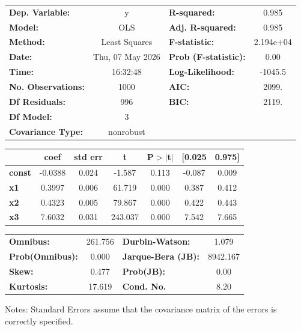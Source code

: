 \begin{center}
\begin{tabular}{lclc}
\toprule
\textbf{Dep. Variable:}    &        y         & \textbf{  R-squared:         } &     0.985   \\
\textbf{Model:}            &       OLS        & \textbf{  Adj. R-squared:    } &     0.985   \\
\textbf{Method:}           &  Least Squares   & \textbf{  F-statistic:       } & 2.194e+04   \\
\textbf{Date:}             & Thu, 07 May 2026 & \textbf{  Prob (F-statistic):} &     0.00    \\
\textbf{Time:}             &     16:32:48     & \textbf{  Log-Likelihood:    } &   -1045.5   \\
\textbf{No. Observations:} &        1000      & \textbf{  AIC:               } &     2099.   \\
\textbf{Df Residuals:}     &         996      & \textbf{  BIC:               } &     2119.   \\
\textbf{Df Model:}         &           3      & \textbf{                     } &             \\
\textbf{Covariance Type:}  &    nonrobust     & \textbf{                     } &             \\
\bottomrule
\end{tabular}
\begin{tabular}{lcccccc}
               & \textbf{coef} & \textbf{std err} & \textbf{t} & \textbf{P$> |$t$|$} & \textbf{[0.025} & \textbf{0.975]}  \\
\midrule
\textbf{const} &      -0.0388  &        0.024     &    -1.587  &         0.113        &       -0.087    &        0.009     \\
\textbf{x1}    &       0.3997  &        0.006     &    61.719  &         0.000        &        0.387    &        0.412     \\
\textbf{x2}    &       0.4323  &        0.005     &    79.867  &         0.000        &        0.422    &        0.443     \\
\textbf{x3}    &       7.6032  &        0.031     &   243.037  &         0.000        &        7.542    &        7.665     \\
\bottomrule
\end{tabular}
\begin{tabular}{lclc}
\textbf{Omnibus:}       & 261.756 & \textbf{  Durbin-Watson:     } &    1.079  \\
\textbf{Prob(Omnibus):} &   0.000 & \textbf{  Jarque-Bera (JB):  } & 8942.167  \\
\textbf{Skew:}          &   0.477 & \textbf{  Prob(JB):          } &     0.00  \\
\textbf{Kurtosis:}      &  17.619 & \textbf{  Cond. No.          } &     8.20  \\
\bottomrule
\end{tabular}
\end{center}

Notes: \newline
 [1] Standard Errors assume that the covariance matrix of the errors is correctly specified.